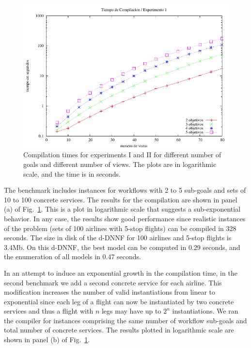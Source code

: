 \documentclass{llncs}
\begin{document}
\begin{figure}[t]
\centering
\includegraphics[width=1\textwidth]{plots/plot1}
\caption{Compilation times for experiments I and II for different
number of goals and different number of views. The plots are in
logarithmic scale, and the time is in seconds.}
\label{fig:plot1}
\end{figure}

The benchmark includes instances for workflows with 2 to 5 sub-goals and
sets of 10 to 100 concrete services. The results for the compilation are
shown in panel (a) of Fig.~\ref{fig:plot1}. This is a plot in logarithmic
scale that suggests a sub-exponential behavior. In any case, the results
show good performance since realistic instances of the problem (sets of 100
airlines with 5-stop flights) can be compiled in 328 seconds.
The size in disk of the d-DNNF for 100 airlines and 5-stop flights is 3.4Mb.
On this d-DNNF, the best model can be computed in 0.29 seconds,
and the enumeration of all models in 0.47 seconds.

In an attempt to induce an exponential growth in the compilation time,
in the second benchmark we add a second concrete service for each airline.
This modification increases the number of valid instantiations from linear
to exponential since each leg of a flight can now be instantiated by two
concrete services and thus a flight with $n$ legs may have up to $2^n$
instantiations.
We ran the compiler for instances comprising the same number of workflow
sub-goals and total number of concrete services. The results plotted in
logarithmic scale are shown in panel (b) of Fig.~\ref{fig:plot1}.
\end{document}
